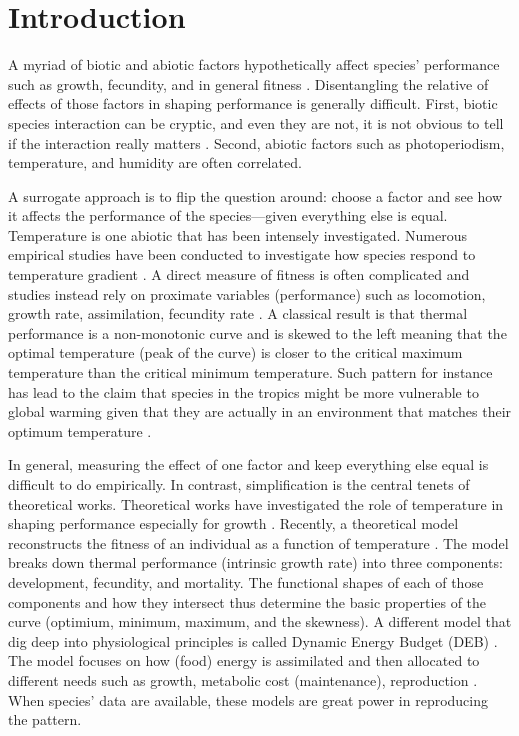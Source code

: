 \section*{Introduction}
A myriad of biotic and abiotic factors  hypothetically affect species' performance such as growth, fecundity, and in general fitness \citep{Krebs2000}.
Disentangling the relative of effects of those factors in shaping performance is generally difficult.
First, biotic species interaction can be cryptic, and even they are not, it is not obvious to tell if the interaction really matters \citep{Morales2015}.
Second, abiotic factors such as photoperiodism, temperature, and humidity are often correlated.
 
A surrogate approach is to flip the question around: choose a factor and see how it affects the performance of the species---given everything else is equal.
Temperature is one abiotic that has been intensely investigated.
Numerous empirical studies have been conducted to investigate how species respond to temperature gradient \citep[e.g.,][]{Angilletta2009}.
A direct measure of fitness is often complicated and studies instead rely on proximate variables (performance) such as locomotion, growth rate, assimilation, fecundity rate \citep[][and references therein]{Angilletta2009}.
A classical result is that thermal performance is a non-monotonic curve and is skewed to the left meaning that the optimal temperature (peak of the curve) is closer to the critical maximum temperature than the critical minimum temperature. 
Such pattern for instance has lead to the claim that species in the tropics might be more vulnerable to global warming given that they are actually in an environment that matches their optimum temperature \citep{Deutsch2008}.

In general, measuring the effect of one factor and keep everything else equal  is difficult to do empirically.
In contrast, simplification is the central tenets of theoretical works.
Theoretical works have investigated the role of temperature in shaping performance especially for growth \citep{VandH1996, Kozlowski2004}.
Recently, a theoretical model reconstructs the fitness of an individual as a function of temperature \citep{Amarasekare2012}.
The model  breaks down thermal performance (intrinsic growth rate)  into three components: development, fecundity, and mortality.
The functional shapes of each of those components and how they intersect thus determine the basic properties of the curve (optimium, minimum, maximum, and the skewness).
A different model that dig deep into physiological principles is called Dynamic Energy Budget (DEB) \citep{Kooijman2009}.
The model focuses on how (food) energy is assimilated and then allocated to different needs such as growth, metabolic cost (maintenance), reproduction \citep{Kooijman2009}.
When species'  data are available, these models are great power in reproducing the pattern. 

